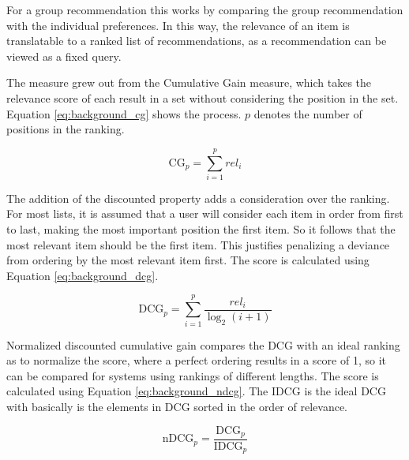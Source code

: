 For a group recommendation this works by comparing the group recommendation with the individual preferences. In this way, the relevance of an item is translatable to a ranked list of recommendations, as a recommendation can be viewed as a fixed query.

The measure grew out from the Cumulative Gain measure, which takes the relevance score of each result in a set without considering the position in the set. Equation \ref{eq:background_cg} shows the process. $p$ denotes the number of positions in the ranking.

\begin{equation}\label{eq:background_cg}
	\text{CG}_p = \sum_{i=1}^{p}\textit{rel}_i
\end{equation}

The addition of the discounted property adds a consideration over the ranking. For most lists, it is assumed that a user will consider each item in order from first to last, making the most important position the first item. So it follows that the most relevant item should be the first item. This justifies penalizing a deviance from ordering by the most relevant item first. The score is calculated using Equation \ref{eq:background_dcg}.

\begin{equation}\label{eq:background_dcg}
	\text{DCG}_p = \sum_{i=1}^{p}\frac{\textit{rel}_i}{\log_2(i + 1)}
\end{equation}

Normalized discounted cumulative gain compares the DCG with an ideal ranking as to normalize the score, where a perfect ordering results in a score of 1, so it can be compared for systems using rankings of different lengths. The score is calculated using Equation \ref{eq:background_ndcg}. The IDCG is the ideal DCG with basically is the elements in DCG sorted in the order of relevance.


\begin{equation}\label{eq:background_ndcg}
	\text{nDCG}_p = \frac{\text{DCG}_p}{\text{IDCG}_p}
\end{equation}


